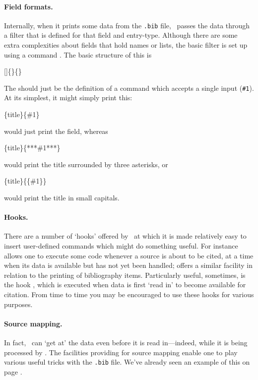 \paragraph{Field formats.} Internally, when it prints some data from
the \verb|.bib| file, \biblatex\ passes the data through a filter that
is defined for that field and entry-type. Although there are some
extra complexities about fields that hold names or lists, the basic
filter is set up using a command . The basic
structure of this is
\begin{pseudoverb}
[]\{\}\{\}
\end{pseudoverb}
The  should just be the definition of a command which
accepts a single input (\texttt{\#1}). At its simplest, it
might simply print this:
\begin{pseudoverb}
\{title\}\{\#1\}
\end{pseudoverb}
would just print the field, whereas
\begin{pseudoverb}
\{title\}\{***\#1***\}
\end{pseudoverb}
would print the title surrounded by three asterisks, or
\begin{pseudoverb}
\{title\}\{\{\#1\}\}
\end{pseudoverb}
would print the title in small capitals.

\paragraph{Hooks.} There are a number of `hooks' offered by \biblatex\
at which it is made relatively easy to insert user-defined commands
which might do something useful. For instance \cs{AtEveryCitekey} allows
one to execute some code whenever a source is about to be cited, at a
time when its data is available but has not yet been handled;
 offers a similar facility in relation to the
printing of bibliography items. Particularly useful, sometimes, is the
hook \cs{AtDataInput}, which is executed when data is first `read in'
to become available for citation. From time to time you may be
encouraged to use these hooks for various purposes.

\paragraph{Source mapping.} In fact, \biblatex\ can `get at' the data
even before it is read in---indeed, while it is being processed by
\package{biber}. The facilities providing for source mapping enable
one to play various useful tricks with the \verb|.bib| file. We've
already seen an example of this on page \pageref{datamap}.

